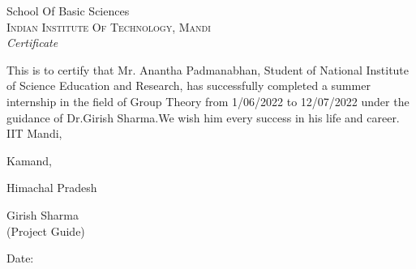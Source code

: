 \newpage
\thispagestyle{empty}

\begin{center}

\huge{School Of Basic Sciences}\\[0.5cm]
\normalsize
\textsc{Indian Institute Of Technology, Mandi}\\[2.0cm]

\emph{\LARGE Certificate}\\[2.5cm]
\end{center}
This is to certify that Mr. Anantha Padmanabhan, Student of National Institute of Science Education and Research, has successfully completed a summer internship in the field of Group Theory from 1/06/2022 to 12/07/2022 under the guidance of Dr.Girish Sharma.We wish him every success in his life and career.\\


IIT Mandi,

Kamand,

Himachal Pradesh
\normalsize 


\vfill


\begin{flushright}
Girish Sharma\\
(Project Guide)\\
\end{flushright}
\begin{flushleft}
Date:
\end{flushleft}
